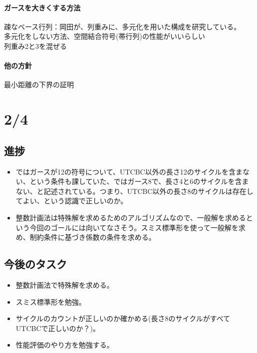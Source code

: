 \documentclass[a4paper,11pt,dvipdfmx]{jsarticle}
\theoremstyle{definition}
\begin{document}
\paragraph{ガースを大きくする方法}
疎なベース行列：岡田が、列重みに、多元化を用いた構成を研究している。\\
多元化をしない方法、空間結合符号(帯行列)の性能がいいらしい\\
列重み2と3を混ぜる\\

\paragraph{他の方針}
最小距離の下界の証明

\section{2/4}
\subsection{進捗}
\begin{itemize}
  \item \cite{kasai2025quantum}ではガースが12の符号について、UTCBC以外の長さ12のサイクルを含まない、という条件も課していた、\cite{kasai2026breakingorthogonalitybarrierquantum}ではガース8で、長さ4と6のサイクルを含まない、と記述されている。つまり、UTCBC以外の長さ8のサイクルは存在してよい、という認識で正しいのか。
  \item 整数計画法は特殊解を求めるためのアルゴリズムなので、一般解を求めるという今回のゴールには向いてなさそう。スミス標準形を使って一般解を求め、制約条件に基づき係数の条件を求める。
\end{itemize}

\subsection{今後のタスク}
\begin{itemize}
  \item 整数計画法で特殊解を求める。
  \item スミス標準形を勉強。
  \item サイクルのカウントが正しいのか確かめる(長さ8のサイクルがすべてUTCBCで正しいのか？)。
  \item 性能評価のやり方を勉強する。
\end{itemize}
\end{document}
